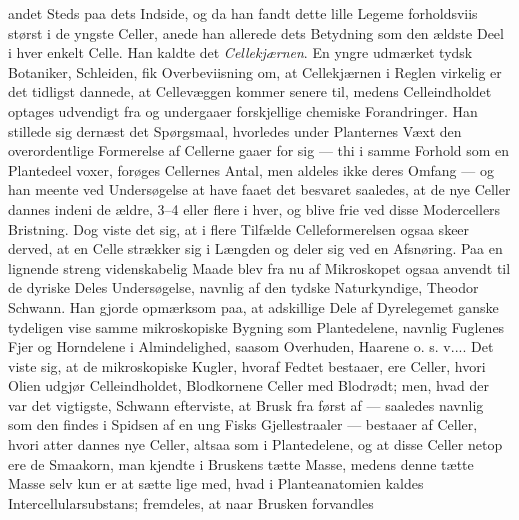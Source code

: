 \documentclass[12pt,a4paper]{book}
\begin{document}
andet Steds paa dets Indside, og da han fandt dette lille Legeme
forholdsviis størst i de yngste Celler, anede han allerede dets Betydning
som den ældste Deel i hver enkelt Celle. Han kaldte det \emph{Cellekjærnen}. En
yngre udmærket tydsk Botaniker, Schleiden, fik Overbeviisning om, at
Cellekjærnen i Reglen virkelig er det tidligst dannede, at Cellevæggen
kommer senere til, medens Celleindholdet optages udvendigt fra og
undergaaer forskjellige chemiske Forandringer. Han stillede sig dernæst
det Spørgsmaal, hvorledes under Planternes Væxt den overordentlige
Formerelse af Cellerne gaaer for sig — thi i samme Forhold som en
Plantedeel voxer, forøges Cellernes Antal, men aldeles ikke deres Omfang
— og han meente ved Undersøgelse at have faaet det besvaret saaledes, at
de nye Celler dannes indeni de ældre, 3--4 eller flere i hver, og blive
frie ved disse Modercellers Bristning. Dog viste det sig, at i flere
Tilfælde Celleformerelsen ogsaa skeer derved, at en Celle strækker sig i
Længden og deler sig ved en Afsnøring. Paa en lignende streng
videnskabelig Maade blev fra nu af Mikroskopet ogsaa anvendt til de
dyriske Deles Undersøgelse, navnlig af den tydske Naturkyndige, Theodor
Schwann. Han gjorde opmærksom paa, at adskillige Dele af Dyrelegemet
ganske tydeligen vise samme mikroskopiske Bygning som Plantedelene,
navnlig Fuglenes Fjer og Horndelene i Almindelighed, saasom Overhuden,
Haarene o. s. v.... Det viste sig, at de mikroskopiske Kugler, hvoraf
Fedtet bestaaer, ere Celler, hvori Olien udgjør Celleindholdet,
Blodkornene Celler med Blodrødt; men, hvad der var det vigtigste, Schwann
efterviste, at Brusk fra først af — saaledes navnlig som den findes i
Spidsen af en ung Fisks Gjellestraaler — bestaaer af Celler, hvori atter
dannes nye Celler, altsaa som i Plantedelene, og at disse Celler netop
ere de Smaakorn, man kjendte i Bruskens tætte Masse, medens denne tætte
Masse selv kun er at sætte lige med, hvad i Planteanatomien kaldes
Intercellularsubstans; fremdeles, at naar Brusken forvandles
\end{document}
